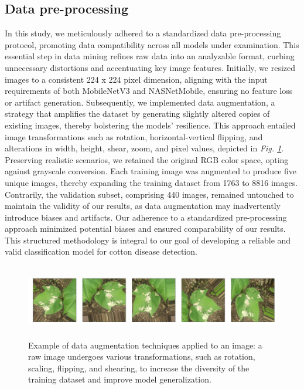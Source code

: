 \documentclass[conference]{IEEEtran}
\begin{document}
\subsection{Data pre-processing}

In this study, we meticulously adhered to a standardized data pre-processing protocol, promoting data compatibility across all models under examination. This essential step in data mining refines raw data into an analyzable format, curbing unnecessary distortions and accentuating key image features. Initially, we resized images to a consistent 224 x 224 pixel dimension, aligning with the input requirements of both MobileNetV3 and NASNetMobile, ensuring no feature loss or artifact generation. Subsequently, we implemented data augmentation, a strategy that amplifies the dataset by generating slightly altered copies of existing images, thereby bolstering the models' resilience. This approach entailed image transformations such as rotation, horizontal-vertical flipping, and alterations in width, height, shear, zoom, and pixel values, depicted in \emph{Fig. \ref{Augment}}. Preserving realistic scenarios, we retained the original RGB color space, opting against grayscale conversion. Each training image was augmented to produce five unique images, thereby expanding the training dataset from 1763 to 8816 images. Contrarily, the validation subset, comprising 440 images, remained untouched to maintain the validity of our results, as data augmentation may inadvertently introduce biases and artifacts. Our adherence to a standardized pre-processing approach minimized potential biases and ensured comparability of our results. This structured methodology is integral to our goal of developing a reliable and valid classification model for cotton disease detection.
 
\begin{figure}[ht]
\centering
\includegraphics[height=3.2cm, width=1\linewidth]{Images/Data_Augmentation2_LI (2).pdf}
\caption{Example of data augmentation techniques applied to an image: a raw image undergoes various transformations, such as rotation, scaling, flipping, and shearing, to increase the diversity of the training dataset and improve model generalization.}
\label{Augment}
\end{figure}
\end{document}
